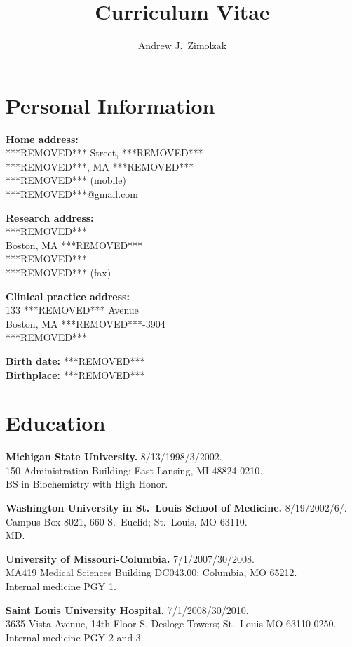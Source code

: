 \documentclass[12pt]{article}
\title{Curriculum Vitae}
\author{Andrew J.\ Zimolzak}
\begin{document}
\thispagestyle{fancy}

\section*{Personal Information}

\textbf{Home address:}\\
***REMOVED*** Street, ***REMOVED***\\
***REMOVED***, MA ***REMOVED***\\
***REMOVED*** (mobile)\\
***REMOVED***@gmail.com

\textbf{Research address:}\\
***REMOVED***\\
Boston, MA ***REMOVED***\\
***REMOVED***\\
***REMOVED*** (fax)

\textbf{Clinical practice address:}\\
133 ***REMOVED*** Avenue\\
Boston, MA ***REMOVED***-3904\\
***REMOVED***

\textbf{Birth date:} ***REMOVED***\\
\textbf{Birthplace:} ***REMOVED***

\section*{Education}

\textbf{Michigan State University.} 8/13/1998/3/2002.\\
150 Administration Building; East Lansing, MI 48824-0210.\\
BS in Biochemistry with High Honor.

\textbf{Washington University in St.\ Louis School of Medicine.}
8/19/2002\ndash{}/6/.\\
Campus Box 8021, 660 S.\ Euclid; St.\ Louis, MO 63110.\\
MD.

\textbf{University of Missouri-Columbia.} 7/1/2007/30/2008.\\
MA419 Medical Sciences Building DC043.00; Columbia, MO 65212.\\
Internal medicine PGY 1.

\textbf{Saint Louis University Hospital.} 7/1/2008/30/2010.\\
3635 Vista Avenue, 14th Floor S, Desloge Towers; St.\ Louis MO
63110-0250.\\
Internal medicine PGY 2 and 3.
\end{document}
